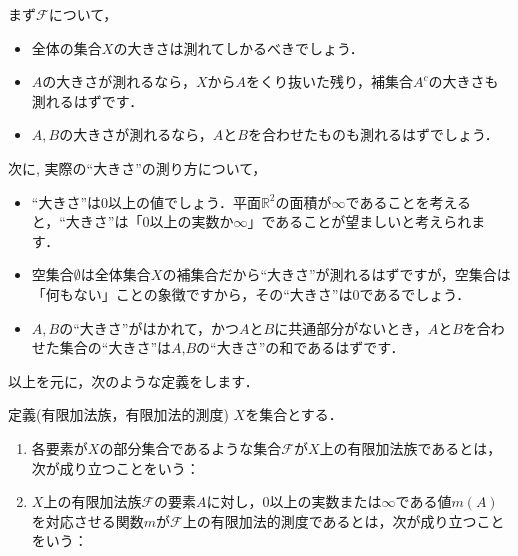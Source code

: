 \par まず$\mathcal{F}$について，
\begin{itemize}
\item 全体の集合$X$の大きさは測れてしかるべきでしょう．
\item $A$の大きさが測れるなら，$X$から$A$をくり抜いた残り，補集合$A^c$の大きさも測れるはずです．
\item $A,B$の大きさが測れるなら，$A$と$B$を合わせたものも測れるはずでしょう．
\end{itemize}
\par 次に, 実際の“大きさ”の測り方について，
\begin{itemize}
\item “大きさ”は0以上の値でしょう．平面$\mathbb{R}^2$の面積が$\infty$であることを考えると，“大きさ”は「0以上の実数か$\infty$」であることが望ましいと考えられます．
\item 空集合$\emptyset$は全体集合$X$の補集合だから“大きさ”が測れるはずですが，空集合は「何もない」ことの象徴ですから，その“大きさ”は0であるでしょう．
\item $A,B$の“大きさ”がはかれて，かつ$A$と$B$に共通部分がないとき，$A$と$B$を合わせた集合の“大きさ”は$A$,$B$の“大きさ”の和であるはずです．
\end{itemize}
\par 以上を元に，次のような定義をします．
\begin{itembox}[l]{定義(有限加法族，有限加法的測度)}
$X$を集合とする．
\begin{enumerate}
\item 各要素が$X$の部分集合であるような集合$\mathcal{F}$が$X$上の有限加法族であるとは，次が成り立つことをいう：
\item $X$上の有限加法族$\mathcal{F}$の要素$A$に対し，0以上の実数または$\infty$である値$m(A)$を対応させる関数$m$が$\mathcal{F}$上の有限加法的測度であるとは，次が成り立つことをいう：
\end{enumerate}
\end{itembox}
